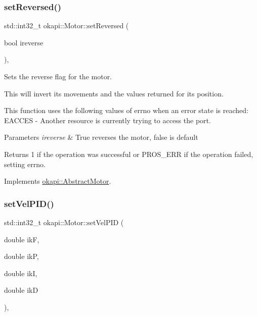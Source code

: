 \subsubsection{\texorpdfstring{setReversed()}{setReversed()}}
{\footnotesize\ttfamily std\+::int32\+\_\+t okapi\+::\+Motor\+::set\+Reversed (\begin{DoxyParamCaption}\item[{bool}]{ireverse }\end{DoxyParamCaption})\hspace{0.3cm}{\ttfamily [override]}, {\ttfamily [virtual]}}

Sets the reverse flag for the motor.

This will invert its movements and the values returned for its position.

This function uses the following values of errno when an error state is reached\+: E\+A\+C\+C\+ES -\/ Another resource is currently trying to access the port.


\begin{DoxyParams}{Parameters}
{\em ireverse} & True reverses the motor, false is default \\
\hline
\end{DoxyParams}
\begin{DoxyReturn}{Returns}
1 if the operation was successful or P\+R\+O\+S\+\_\+\+E\+RR if the operation failed, setting errno. 
\end{DoxyReturn}


Implements \mbox{\hyperlink{classokapi_1_1AbstractMotor_a72a6a4eb9d237ad57b92401b08ad64fa}{okapi\+::\+Abstract\+Motor}}.

\mbox{\label{classokapi_1_1Motor_a6a78550fa3eee6efa092307e4b159d68}} 
\subsubsection{\texorpdfstring{setVelPID()}{setVelPID()}}
{\footnotesize\ttfamily std\+::int32\+\_\+t okapi\+::\+Motor\+::set\+Vel\+P\+ID (\begin{DoxyParamCaption}\item[{double}]{ikF,  }\item[{double}]{ikP,  }\item[{double}]{ikI,  }\item[{double}]{ikD }\end{DoxyParamCaption})\hspace{0.3cm}{\ttfamily [override]}, {\ttfamily [virtual]}}

